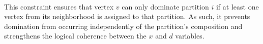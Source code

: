 \paragraph{} This constraint ensures that vertex $v$ can only dominate partition $i$ if at least one vertex from its neighborhood is assigned to that partition. As such, it prevents domination from occurring independently of the partition's composition and strengthens the logical coherence between the $x$ and $d$ variables.
